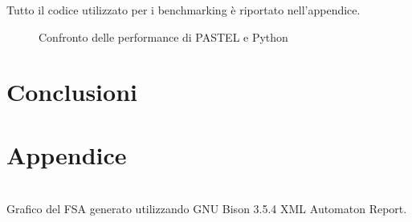 \documentclass[10pt]{article}
\begin{document}
Tutto il codice utilizzato per i benchmarking è riportato nell'appendice.



\begin{figure}
	\centering
	\caption{Confronto delle performance di PASTEL e Python}
	\label{fig:performance-comparison}
\end{figure}


\section{Conclusioni}\label{section:conclusioni}



\clearpage



\clearpage
\section*{Appendice}\label{section:appendix}

\begin{center}
	\centering
	\\
	Grafico del FSA generato utilizzando GNU Bison 3.5.4 XML Automaton Report.
\end{center}









\end{document}
